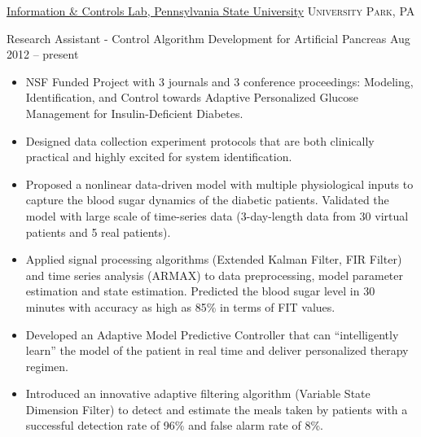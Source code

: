 \documentclass[10pt,a4paper]{article}
\begin{document}




\spacedhrule{0.5em}{-0.8em}


\headedsection
{\href{http://sites.psu.edu/jinyuxie/research/}{Information \& Controls Lab, Pennsylvania State University}}
{\textsc{University Park, PA}}
  {
    \headedsubsection
    {Research Assistant - Control Algorithm Development for Artificial Pancreas}
    {Aug 2012 -- present}
    {
      \begin{itemize}
      \item NSF Funded Project with 3 journals and 3 conference proceedings:
        Modeling, Identification, and Control towards Adaptive Personalized Glucose
        Management for Insulin-Deficient Diabetes.
        
      \item Designed data collection experiment protocols that are both
        clinically practical and highly excited for system identification.

      \item Proposed a nonlinear data-driven model with multiple physiological
        inputs to capture the blood sugar dynamics of the diabetic patients.
        Validated the model with large scale of time-series data (3-day-length
        data from 30 virtual patients and 5 real patients). 
        
      \item Applied signal processing algorithms (Extended Kalman Filter, FIR
        Filter) and time series analysis (ARMAX) to data preprocessing, model
        parameter estimation and state estimation. Predicted the blood sugar level in 30
        minutes with accuracy as high as 85\% in terms of FIT values.

      \item Developed an Adaptive Model Predictive Controller that can
        ``intelligently learn'' the model of the patient in real time and deliver
        personalized therapy regimen.
        
      \item Introduced an innovative adaptive filtering algorithm (Variable
        State Dimension Filter) to detect and estimate the meals taken by
        patients with a successful detection rate of 96\% and false alarm rate
        of 8\%.
      \end{itemize}
    }
  }
\end{document}

